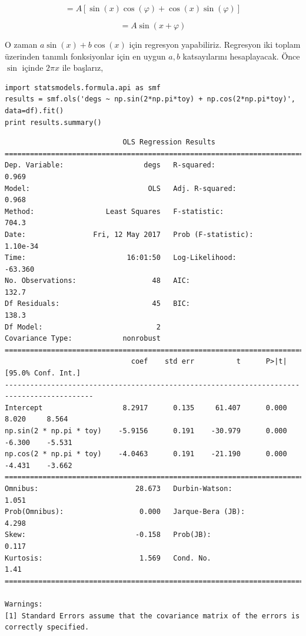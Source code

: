 \documentclass[12pt,fleqn]{article}\usepackage{../../common}
\begin{document}
$$  = A\left[\sin(x)\cos(\varphi) + \cos(x)\sin(\varphi)\right] $$

$$ = A\sin(x+\varphi) $$

O zaman $a \sin(x) + b \cos(x)$ için regresyon yapabiliriz. Regresyon iki toplam
üzerinden tanımlı fonksiyonlar için en uygun $a,b$ katsayılarını
hesaplayacak. Önce $\sin$ içinde $2\pi x$ ile başlarız, 

\begin{verbatim}
import statsmodels.formula.api as smf
results = smf.ols('degs ~ np.sin(2*np.pi*toy) + np.cos(2*np.pi*toy)', data=df).fit()
print results.summary()
\end{verbatim}

\begin{verbatim}
                            OLS Regression Results                            
==============================================================================
Dep. Variable:                   degs   R-squared:                       0.969
Model:                            OLS   Adj. R-squared:                  0.968
Method:                 Least Squares   F-statistic:                     704.3
Date:                Fri, 12 May 2017   Prob (F-statistic):           1.10e-34
Time:                        16:01:50   Log-Likelihood:                -63.360
No. Observations:                  48   AIC:                             132.7
Df Residuals:                      45   BIC:                             138.3
Df Model:                           2                                         
Covariance Type:            nonrobust                                         
===========================================================================================
                              coef    std err          t      P>|t|      [95.0% Conf. Int.]
-------------------------------------------------------------------------------------------
Intercept                   8.2917      0.135     61.407      0.000         8.020     8.564
np.sin(2 * np.pi * toy)    -5.9156      0.191    -30.979      0.000        -6.300    -5.531
np.cos(2 * np.pi * toy)    -4.0463      0.191    -21.190      0.000        -4.431    -3.662
==============================================================================
Omnibus:                       28.673   Durbin-Watson:                   1.051
Prob(Omnibus):                  0.000   Jarque-Bera (JB):                4.298
Skew:                          -0.158   Prob(JB):                        0.117
Kurtosis:                       1.569   Cond. No.                         1.41
==============================================================================

Warnings:
[1] Standard Errors assume that the covariance matrix of the errors is correctly specified.
\end{verbatim}
\end{document}

